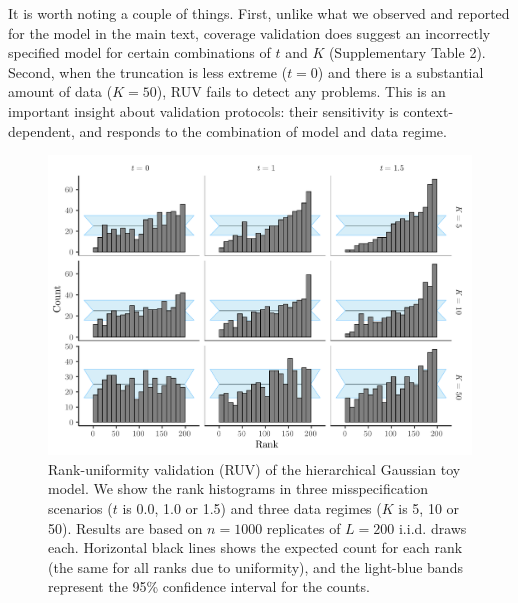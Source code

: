 \documentclass[oneside]{article}
\begin{document}
It is worth noting a couple of things.
First, unlike what we observed and reported for the model in the main text, coverage validation does suggest an incorrectly specified model for certain combinations of $t$ and $K$ (Supplementary Table 2).
Second, when the truncation is less extreme ($t = 0$) and there is a substantial amount of data ($K = 50$), RUV fails to detect any problems.
This is an important insight about validation protocols: their sensitivity is context-dependent, and responds to the combination of model and data regime.

\begin{figure}[!ht]
   \includegraphics[width=\linewidth]{../figures/sbc_normal_manual.pdf}
  \caption{Rank-uniformity validation (RUV) of the hierarchical Gaussian toy model.
  We show the rank histograms in three misspecification scenarios ($t$
  is 0.0, 1.0 or 1.5) and three data regimes ($K$ is 5, 10 or 50).
  Results are based on $n=1000$ replicates of $L= 200$ i.i.d. draws each.
  Horizontal black lines shows the expected count for each rank (the same for all ranks due to uniformity), and the light-blue bands represent the 95\% confidence interval for the counts.
    }
  \label{supfig:ruv_normal_toy}
\end{figure}
\end{document}
